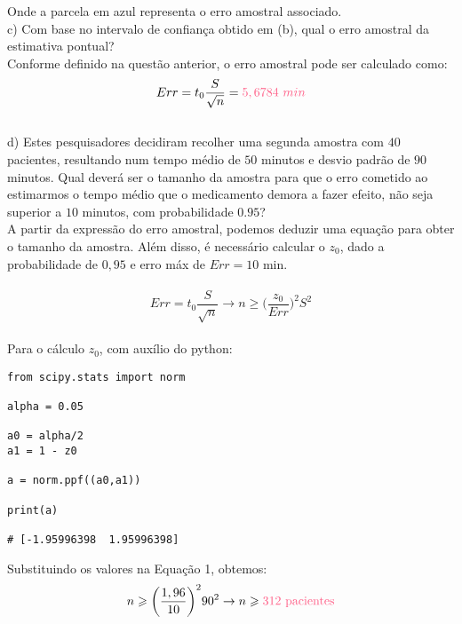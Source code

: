Onde a parcela em \textcolor{deepblue}{azul} representa o erro amostral associado.\\

c) Com base no intervalo de confiança obtido em (b), qual o erro amostral da estimativa pontual?\\

Conforme definido na questão anterior, o erro amostral pode ser calculado como:\\

\[
    Err = t_0\frac{S}{\sqrt{n}} = \textcolor{COLOR2}{5,6784\ min}
\]
\\

d) Estes pesquisadores decidiram recolher uma segunda amostra com $40$ pacientes, resultando num tempo médio de $50$ minutos e desvio padrão de $90$ minutos. Qual deverá ser o tamanho da amostra para que o erro cometido ao estimarmos o tempo médio que o medicamento demora a fazer efeito, não seja superior a $10$ minutos, com probabilidade $0.95$?\\

A partir da expressão do erro amostral, podemos deduzir uma equação para obter o tamanho da amostra. Além disso, é necessário calcular o $z_0$, dado a probabilidade de $0,95$ e erro máx de $Err=10$ min.\\
\\

\begin{equation}
    Err = t_0\frac{S}{\sqrt{n}} \to n\geqslant \biggl(\frac{z_0}{Err}\biggr)^2 S^2
\end{equation}
\\

Para o cálculo $z_0$, com auxílio do python:\\

\begin{lstlisting}
from scipy.stats import norm
    
alpha = 0.05
            
a0 = alpha/2
a1 = 1 - z0
    
a = norm.ppf((a0,a1))
            
print(a)
    
# [-1.95996398  1.95996398]
\end{lstlisting}

Substituindo os valores na Equação 1, obtemos:\\

\[
    n\geqslant \biggl(\frac{1,96}{10}\biggr)^290^2 \to n \geqslant \textcolor{COLOR2}{312\ \text{pacientes}}
\]
\\

